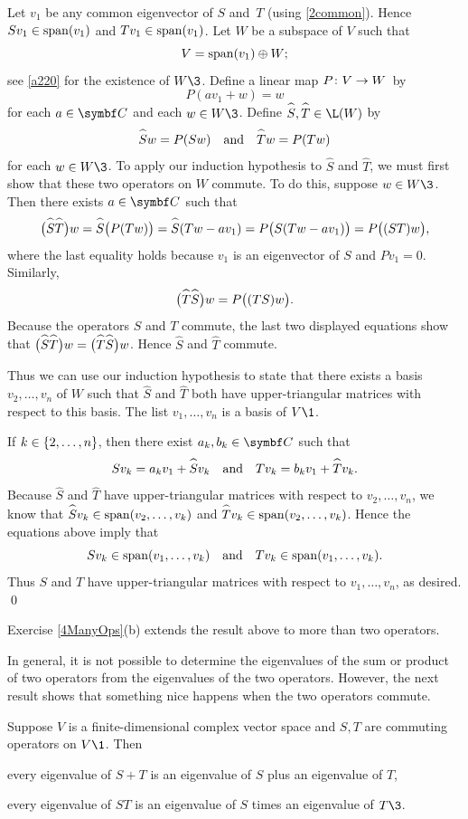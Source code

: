 Let $v_1$ be any common eigenvector of $S$ and~$T$ (using \ref{2common}). Hence
$
Sv_1 \in \operatorname{span}(v_1)$ and $Tv_1 \in \operatorname{span}(v_1)$.
Let $W$ be a subspace of $V$ such that
\[
V = \operatorname{span}(v_1) \oplus W;
\]
see \ref{a220} for the existence of $W\3$. Define a linear map $P \colon V \to W$~by
\[
P(a v_1 + w) = w
\]
for each $a \in \C{}$ and each $w \in W\3$. Define $\hat S, \hat T \in \L(W)$ by
\[
\hat S w = P(Sw) \andd \hat T w = P(Tw)
\]
for each $w \in W\3$. To apply our induction hypothesis to $\hat S$ and $\hat T$, we must first show that these two operators on $W$ commute. To do this, suppose $w \in W\3$. Then there exists $a \in \C{}$ such that
\[
\paren[\big]{\hat S \hat T}w = \hat S \paren[\big]{ P(Tw) } = \hat S (Tw - av_1) = P \paren[\big]{ S(Tw - a v_1) }
= P \paren[\big]{ (ST) w },
\]
where the last equality holds because $v_1$ is an eigenvector of $S$ and $Pv_1 = 0$. Similarly,
\[
\paren[\big]{\hat T \hat S}w = P \paren[\big]{ (TS) w }.
\]
Because the operators $S$ and $T$ commute, the last two displayed equations show that
$\paren[\big]{\hat S \hat T}w = \paren[\big]{\hat T \hat S}w$. Hence $\hat S$ and $\hat T$ commute.

Thus we can use our induction hypothesis to state that there exists a basis $v_2, \ldots, v_n$ of $W$ such that $\hat S$ and $\hat T$ both have upper-triangular matrices with respect to this basis. The list $v_1, \ldots, v_n$ is a basis of $V\1$.

If $k \in \{2, \ldots, n\}$, then there exist $a_k, b_k \in \C{}$ such that
\[
Sv_k =  a_k v_1 + \hat S v_k \andd Tv_k = b_k v_1 + \hat T v_k.
\]
Because $\hat S$ and $\hat T$ have upper-triangular matrices with respect to $v_2, \ldots, v_n$, we know that
$
\hat S v_k \in \Span(v_2, \ldots, v_k)$ and $\hat T v_k \in \Span(v_2, \ldots, v_k)$.
Hence the equations above imply that
\[
Sv_k \in \operatorname{span}(v_1, \ldots, v_k) \quad \text{and} \quad Tv_k \in \operatorname{span}(v_1, \ldots, v_k).
\]
Thus $S$ and $T$ have upper-triangular matrices with respect to $v_1, \ldots, v_n$, as desired.
\qed

Exercise \ref{4ManyOps}(b) extends the result above to more than two operators.

\pagebreak[3]

In general, it is not possible to determine the eigenvalues of the sum or product of two operators from the eigenvalues of the two operators. However, the next result shows that something nice happens when the two operators commute.

{Suppose $V$ is a finite-dimensional complex vector space and $S, T$ are commuting operators on $V\1$. Then
\begin{Itemize}
\item
every eigenvalue of $S + T$ is an eigenvalue of $S$ plus an eigenvalue of $T$,
\item
every eigenvalue of $ST$ is an eigenvalue of $S$ times an eigenvalue of $T\3$.
\end{Itemize}}


